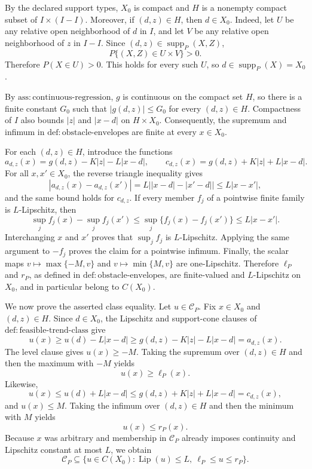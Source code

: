 By the declared support types, \(X_0\) is compact and \(H\) is a nonempty compact subset of \(I\times(I-I)\).  Moreover, if \((d,z)\in H\), then \(d\in X_0\).  Indeed, let \(U\) be any relative open neighborhood of \(d\) in \(I\), and let \(V\) be any relative open neighborhood of \(z\) in \(I-I\).  Since \((d,z)\in\operatorname{supp}_P(X,Z)\),
\[
P\{(X,Z)\in U\times V\}>0.
\]
Therefore \(P(X\in U)>0\).  This holds for every such \(U\), so \(d\in\operatorname{supp}_P(X)=X_0\).

By \(\mathrm{ass:continuous\mbox{-}regression}\), \(g\) is continuous on the compact set \(H\), so there is a finite constant \(G_0\) such that \(|g(d,z)|\le G_0\) for every \((d,z)\in H\).  Compactness of \(I\) also bounds \(|z|\) and \(|x-d|\) on \(H\times X_0\).  Consequently, the supremum and infimum in \(\mathrm{def:obstacle\mbox{-}envelopes}\) are finite at every \(x\in X_0\).

For each \((d,z)\in H\), introduce the functions
\[
a_{d,z}(x)=g(d,z)-K|z|-L|x-d|,
\qquad
c_{d,z}(x)=g(d,z)+K|z|+L|x-d|.
\]
For all \(x,x'\in X_0\), the reverse triangle inequality gives
\[
|a_{d,z}(x)-a_{d,z}(x')|
=L\bigl||x-d|-|x'-d|\bigr|
\le L|x-x'|,
\]
and the same bound holds for \(c_{d,z}\).  If every member \(f_j\) of a pointwise finite family is \(L\)-Lipschitz, then
\[
\sup_j f_j(x)-\sup_j f_j(x')
\le \sup_j\{f_j(x)-f_j(x')\}
\le L|x-x'|.
\]
Interchanging \(x\) and \(x'\) proves that \(\sup_j f_j\) is \(L\)-Lipschitz.  Applying the same argument to \(-f_j\) proves the claim for a pointwise infimum.  Finally, the scalar maps \(v\mapsto\max\{-M,v\}\) and \(v\mapsto\min\{M,v\}\) are one-Lipschitz.  Therefore \(\ell_P\) and \(r_P\), as defined in \(\mathrm{def:obstacle\mbox{-}envelopes}\), are finite-valued and \(L\)-Lipschitz on \(X_0\), and in particular belong to \(C(X_0)\).

We now prove the asserted class equality.  Let \(u\in\mathcal C_P\).  Fix \(x\in X_0\) and \((d,z)\in H\).  Since \(d\in X_0\), the Lipschitz and support-cone clauses of \(\mathrm{def:feasible\mbox{-}trend\mbox{-}class}\) give
\[
u(x)
\ge u(d)-L|x-d|
\ge g(d,z)-K|z|-L|x-d|
=a_{d,z}(x).
\]
The level clause gives \(u(x)\ge -M\).  Taking the supremum over \((d,z)\in H\) and then the maximum with \(-M\) yields
\[
u(x)\ge \ell_P(x).
\]
Likewise,
\[
u(x)
\le u(d)+L|x-d|
\le g(d,z)+K|z|+L|x-d|
=c_{d,z}(x),
\]
and \(u(x)\le M\).  Taking the infimum over \((d,z)\in H\) and then the minimum with \(M\) yields
\[
u(x)\le r_P(x).
\]
Because \(x\) was arbitrary and membership in \(\mathcal C_P\) already imposes continuity and Lipschitz constant at most \(L\), we obtain
\[
\mathcal C_P
\subseteq
\{u\in C(X_0):\operatorname{Lip}(u)\le L,\ \ell_P\le u\le r_P\}.
\]

